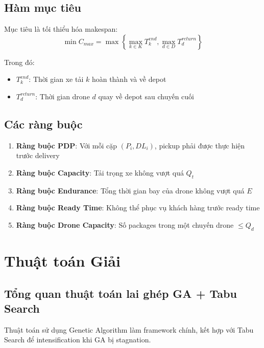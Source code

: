 \documentclass[12pt,a4paper]{article}
\begin{document}
\subsection{Hàm mục tiêu}

Mục tiêu là tối thiểu hóa makespan:
\begin{equation}
    \min C_{max} = \max\left\{\max_{k \in K} T_k^{end}, \max_{d \in D} T_d^{return}\right\}
\end{equation}

Trong đó:
\begin{itemize}
    \item $T_k^{end}$: Thời gian xe tải $k$ hoàn thành và về depot
    \item $T_d^{return}$: Thời gian drone $d$ quay về depot sau chuyến cuối
\end{itemize}

\subsection{Các ràng buộc}

\begin{enumerate}
    \item \textbf{Ràng buộc PDP}: Với mỗi cặp $(P_i, DL_i)$, pickup phải được thực hiện trước delivery
    \item \textbf{Ràng buộc Capacity}: Tải trọng xe không vượt quá $Q_t$
    \item \textbf{Ràng buộc Endurance}: Tổng thời gian bay của drone không vượt quá $E$
    \item \textbf{Ràng buộc Ready Time}: Không thể phục vụ khách hàng trước ready time
    \item \textbf{Ràng buộc Drone Capacity}: Số packages trong một chuyến drone $\leq Q_d$
\end{enumerate}

\section{Thuật toán Giải}

\subsection{Tổng quan thuật toán lai ghép GA + Tabu Search}

Thuật toán sử dụng Genetic Algorithm làm framework chính, kết hợp với Tabu Search để intensification khi GA bị stagnation.
\end{document}
